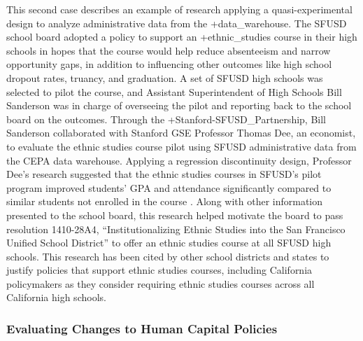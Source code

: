 \documentclass[
]{book}
\begin{document}
This second case describes an example of research applying a quasi-experimental design to analyze administrative data from the +data\_warehouse\textbar. The SFUSD school board adopted a policy to support an +ethnic\_studies\textbar{} course in their high schools in hopes that the course would help reduce absenteeism and narrow opportunity gaps, in addition to influencing other outcomes like high school dropout rates, truancy, and graduation. A set of SFUSD high schools was selected to pilot the course, and Assistant Superintendent of High Schools Bill Sanderson was in charge of overseeing the pilot and reporting back to the school board on the outcomes. Through the +Stanford-SFUSD\_Partnership\textbar, Bill Sanderson collaborated with Stanford GSE Professor Thomas Dee, an economist, to evaluate the ethnic studies course pilot using SFUSD administrative data from the CEPA data warehouse. Applying a regression discontinuity design, Professor Dee's research suggested that the ethnic studies courses in SFUSD's pilot program improved students' GPA and attendance significantly compared to similar students not enrolled in the course \citep{dee2017}. Along with other information presented to the school board, this research helped motivate the board to pass resolution 1410-28A4, ``Institutionalizing Ethnic Studies into the San Francisco Unified School District'' \citep{sanfranciscounifiedschooldistrict2014} to offer an ethnic studies course at all SFUSD high schools. This research has been cited by other school districts \citep{cuevas2019} and states \citep{ragland2017} to justify policies that support ethnic studies courses, including California policymakers as they consider requiring ethnic studies courses across all California high schools.

\hypertarget{evaluating-changes-to-human-capital-policies}{%
\subsubsection*{Evaluating Changes to Human Capital Policies}\label{evaluating-changes-to-human-capital-policies}}
\end{document}
